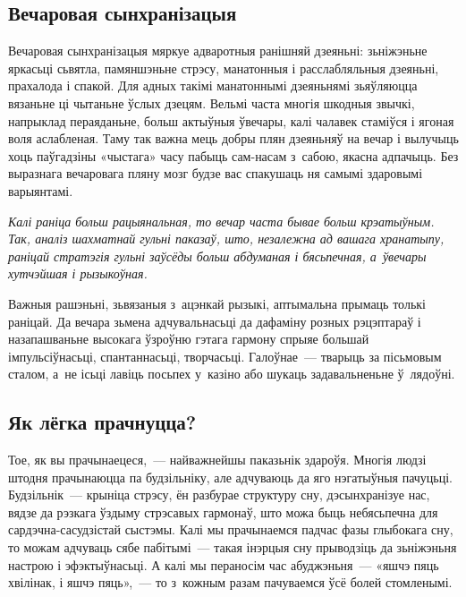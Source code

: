 \subsection*{Вечаровая сынхранізацыя}

Вечаровая сынхранізацыя мяркуе адваротныя ранішняй дзеяньні: зьніжэньне яркасьці сьвятла, памяншэньне стрэсу, манатонныя і расслабляльныя дзеяньні, прахалода і спакой. Для адных такімі манатоннымі дзеяньнямі зьяўляюцца вязаньне ці чытаньне ўслых дзецям. Вельмі часта многія шкодныя звычкі, напрыклад пераяданьне, больш актыўныя ўвечары, калі чалавек стаміўся і ягоная воля аслабленая. Таму так важна мець добры плян дзеяньняў на вечар і вылучыць хоць паўгадзіны «чыстага» часу пабыць сам-насам з~сабою, якасна адпачыць. Без выразнага вечаровага пляну мозг будзе вас спакушаць ня самымі здаровымі варыянтамі.

\emph{Калі раніца больш рацыянальная, то вечар часта бывае больш крэатыўным. Так, аналіз шахматнай гульні паказаў, што, незалежна ад вашага хранатыпу, раніцай стратэгія гульні заўсёды больш абдуманая і бясьпечная, а~ўвечары хутчэйшая і рызыкоўная.}

Важныя рашэньні, зьвязаныя з~ацэнкай рызыкі, аптымальна прымаць толькі раніцай. Да вечара зьмена адчувальнасьці да дафаміну розных рэцэптараў і назапашваньне высокага ўзроўню гэтага гармону спрыяе большай імпульсіўнасьці, спантаннасьці, творчасьці. Галоўнае~--- тварыць за пісьмовым сталом, а~не ісьці лавіць посьпех у~казіно або шукаць задавальненьне ў~лядоўні. 


\subsection*{Як лёгка прачнуцца?}

Тое, як вы прачынаецеся,~--- найважнейшы паказьнік здароўя. Многія людзі штодня прачынаюцца па будзільніку, але адчуваюць да яго нэгатыўныя пачуцьці. Будзільнік~--- крыніца стрэсу, ён разбурае структуру сну, дэсынхранізуе нас, вядзе да рэзкага ўздыму стрэсавых гармонаў, што можа быць небясьпечна для сардэчна-сасудзістай сыстэмы. Калі мы прачынаемся падчас фазы глыбокага сну, то можам адчуваць сябе пабітымі~--- такая інэрцыя сну прыводзіць да зьніжэньня настрою і эфэктыўнасьці. А калі мы пераносім час абуджэньня~--- «яшчэ пяць хвілінак, і яшчэ пяць»,~--- то з~кожным разам пачуваемся ўсё болей стомленымі.


